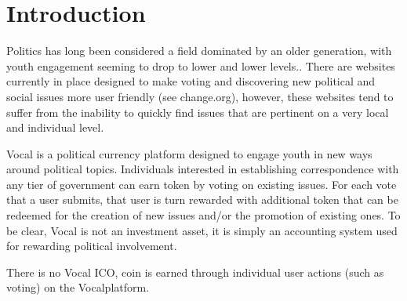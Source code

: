 \documentclass[conference]{IEEEtran}
\begin{document}
    
    \IEEEpeerreviewmaketitle
    \section{Introduction}

    Politics has long been considered a field dominated by an older generation, with youth engagement seeming to drop to lower and lower levels.. There are websites currently in place designed to make voting and discovering new political and social issues more user friendly (see change.org), however, these websites tend to suffer from the inability to quickly find issues that are pertinent on a very local and individual level.
    
    Vocal is a political currency platform designed to engage youth in new ways around political topics. Individuals interested in establishing correspondence with any tier of government can earn token by voting on existing issues. For each vote that a user submits, that user is turn rewarded with additional token that can be redeemed for the creation of new issues and/or the promotion of existing ones. To be clear, Vocal is not an investment asset, it is simply an accounting system used for rewarding political involvement.

    There is no Vocal ICO, coin is earned through individual user actions (such as voting) on the Vocalplatform.

\end{document}
